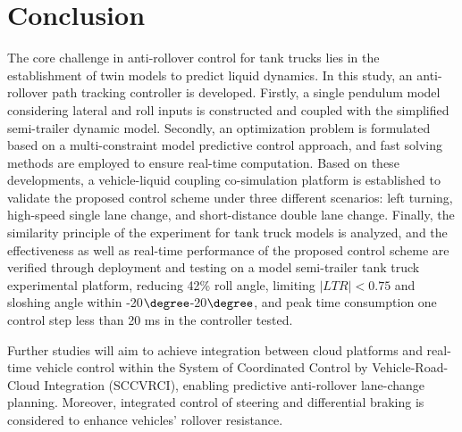 \vspace{-0.6cm}
\section{Conclusion}
The core challenge in anti-rollover control for tank trucks lies in the establishment of twin models to predict liquid dynamics. In this study, an anti-rollover path tracking controller is developed. Firstly, a single pendulum model considering lateral and roll inputs is constructed and coupled with the simplified semi-trailer dynamic model. Secondly, an optimization problem is formulated based on a multi-constraint model predictive control approach, and fast solving methods are employed to ensure real-time computation. Based on these developments, a vehicle-liquid coupling co-simulation platform is established to validate the proposed control scheme under three different scenarios: left turning, high-speed single lane change, and short-distance double lane change. Finally, the similarity principle of the experiment for tank truck models is analyzed, and the effectiveness as well as real-time performance of the proposed control scheme are verified through deployment and testing on a model semi-trailer tank truck experimental platform, reducing 42\% roll angle, limiting $|LTR|<0.75$ and sloshing angle within -20$\degree$-20$\degree$, and peak time consumption one control step less than 20 ms in the controller tested. 

Further studies will aim to achieve integration between cloud platforms and real-time vehicle control within the System of Coordinated Control by Vehicle-Road-Cloud Integration (SCCVRCI), enabling predictive anti-rollover lane-change planning. Moreover, integrated control of steering and differential braking is considered to enhance vehicles' rollover resistance.

\vspace{-0.6cm}